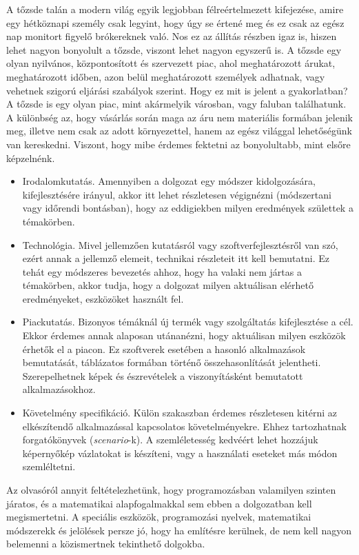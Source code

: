 A tőzsde talán a modern világ egyik legjobban félreértelmezett kifejezése, amire egy hétköznapi személy csak legyint, hogy úgy se értené meg és ez csak az egész nap monitort figyelő brókereknek való. Nos ez az állítás részben igaz is, hiszen lehet nagyon bonyolult a tőzsde, viszont lehet nagyon egyszerű is.
	A tőzsde egy olyan nyilvános, központosított és szervezett piac, ahol meghatározott árukat, meghatározott időben, azon belül meghatározott személyek adhatnak, vagy vehetnek szigorú eljárási szabályok szerint.  Hogy ez mit is jelent a gyakorlatban? A tőzsde is egy olyan piac, mint akármelyik városban, vagy faluban találhatunk. A különbség az, hogy vásárlás során maga az áru nem materiális formában jelenik meg, illetve nem csak az adott környezettel, hanem az egész világgal lehetőségünk van kereskedni. Viszont, hogy mibe érdemes fektetni az bonyolultabb, mint elsőre képzelnénk. 
\begin{itemize}
\item Irodalomkutatás. Amennyiben a dolgozat egy módszer kidolgozására, kifejlesztésére irányul, akkor itt lehet részletesen végignézni (módszertani vagy időrendi bontásban), hogy az eddigiekben milyen eredmények születtek a témakörben.
\item Technológia. Mivel jellemzően kutatásról vagy szoftverfejlesztésről van szó, ezért annak a jellemző elemeit, technikai részleteit itt kell bemutatni.
Ez tehát egy módszeres bevezetés ahhoz, hogy ha valaki nem jártas a témakörben, akkor tudja, hogy a dolgozat milyen aktuálisan elérhető eredményeket, eszközöket használt fel.
\item Piackutatás. Bizonyos témáknál új termék vagy szolgáltatás kifejlesztése a cél.
Ekkor érdemes annak alaposan utánanézni, hogy aktuálisan milyen eszközök érhetők el a piacon.
Ez szoftverek esetében a hasonló alkalmazások bemutatását, táblázatos formában történő összehasonlítását jelentheti.
Szerepelhetnek képek és észrevételek a viszonyításként bemutatott alkalmazásokhoz.
\item Követelmény specifikáció. Külön szakaszban érdemes részletesen kitérni az elkészítendő alkalmazással kapcsolatos követelményekre.
Ehhez tartozhatnak forgatókönyvek (\textit{scenario}-k).
A szemléletesség kedvéért lehet hozzájuk képernyőkép vázlatokat is készíteni, vagy a használati eseteket más módon szemléltetni.
\end{itemize}


Az olvasóról annyit feltételezhetünk, hogy programozásban valamilyen szinten járatos, és a matematikai alapfogalmakkal sem ebben a dolgozatban kell megismertetni.
A speciális eszközök, programozási nyelvek, matematikai módszerekk és jelölések persze jó, hogy ha említésre kerülnek, de nem kell nagyon belemenni a közismertnek tekinthető dolgokba.
